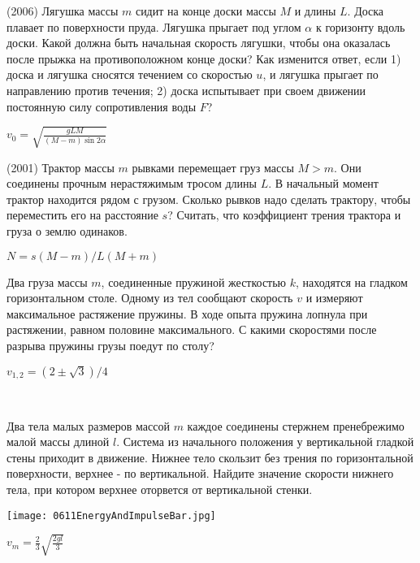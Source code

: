 \begin{ex}
(2006) Лягушка массы $m$ сидит на конце доски массы $M$ и длины $L$. Доска плавает по поверхности пруда. Лягушка прыгает под углом $\alpha$ к горизонту вдоль доски. Какой должна быть начальная скорость лягушки, чтобы она оказалась после прыжка на противоположном конце доски? Как изменится ответ, если 1) доска и лягушка сносятся течением со скоростью $u$, и лягушка прыгает по направлению против течения; 2) доска испытывает при своем движении постоянную силу сопротивления воды $F$?
\begin{ans}
$v_0 = \sqrt{\frac{gLM}{(M-m) \sin 2\alpha}}$
\end{ans}
\end{ex}

\begin{ex}
(2001) Трактор массы $m$ рывками перемещает груз массы $M>m$. Они соединены прочным нерастяжимым тросом длины $L$. В начальный момент трактор находится рядом с грузом. Сколько рывков надо сделать трактору, чтобы переместить его на расстояние $s$?  Считать, что коэффициент трения трактора и груза о землю одинаков.
\begin{ans}
$N = s(M-m)/L(M+m)$
\end{ans}
\end{ex}

\begin{ex}
Два груза массы $m$, соединенные пружиной жесткостью $k$, находятся на гладком горизонтальном столе. Одному из тел сообщают скорость $v$ и измеряют максимальное растяжение пружины. В ходе опыта пружина лопнула при растяжении, равном половине максимального. С какими скоростями после разрыва пружины грузы поедут по столу?
\begin{ans}
$v_{1,2} = (2\pm \sqrt{3})/4$
\end{ans}
\end{ex}

\begin{ex}
\hspace{0pt} \\
\begin{minipage}{.65\textwidth}
Два тела малых размеров массой $m$ каждое соединены стержнем пренебрежимо малой массы длиной $l$. Система из начального положения у вертикальной гладкой стены приходит в движение. Нижнее тело скользит без трения по горизонтальной поверхности, верхнее - по вертикальной. Найдите значение скорости нижнего тела, при котором верхнее оторвется от вертикальной стенки.
\end{minipage}
\begin{minipage}{.35\textwidth}
\centering
\texttt{[image: 0611EnergyAndImpulseBar.jpg]}
\end{minipage}
\begin{ans}
$v_m = \frac{2}{3}\sqrt{\frac{2gl}{3}}$
\end{ans}
\end{ex}

